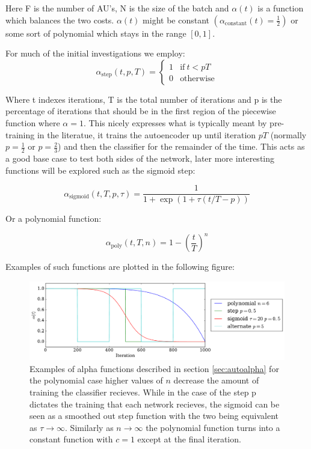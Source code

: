 Here F is the number of AU's, N is the size of the batch and $\alpha(t)$ is a
function which balances the two costs. $\alpha(t)$ might be constant $\left ( \alpha_{\text{constant}}(t)=\frac{1}{2} \right )$ or
some sort of polynomial which stays in the range $[0,1]$.

For much of the initial investigations we employ:
\begin{equation}
\alpha_{\text{step}}(t,p,T) =
\begin{cases}
  1           & \text{if}\ t<pT \\
  0           & \text{otherwise}
\end{cases}
\end{equation}

Where t indexes iterations, T is the total number of iterations and p is the
percentage of iterations that should be in the first region of the piecewise function
where $\alpha=1$.
This nicely expresses what is typically meant by pre-training in the literatue, it trains
the autoencoder up until iteration $pT$ (normally $p=\frac{1}{2}$ or $p=\frac{2}{3}$) and then the classifier for the remainder of the time.
This acts as a good base case to test both sides of the network, later more interesting
functions will be explored such as the sigmoid step:

\begin{equation}
  \alpha_{\text{sigmoid}}(t,T,p,\tau) = \frac{1}{1 + \exp(1 + \tau (t/T - p))}
\end{equation}

Or a polynomial function:

\begin{equation}
  \alpha_{\text{poly}}(t,T,n) = 1 - \left ( \frac{t}{T} \right )^n
\end{equation}

Examples of such functions are plotted in the following figure:

\begin{figure}[!h]
\centering
\includegraphics[width =\hsize]{figures/alpha.pdf}
\caption{Examples of alpha functions described in section \ref{sec:autoalpha}
for the polynomial case higher values of $n$ decrease the amount of training
the classifier recieves. While in the case of the step p dictates the training
that each network recieves, the sigmoid can be seen as a smoothed out step function
with the two being equivalent as $ \tau \rightarrow \infty$. Similarly as $n \rightarrow \infty$
the polynomial function turns into a constant function with $c=1$ except at the final
iteration.}
\label{fig:alpha_functions}
\end{figure}

